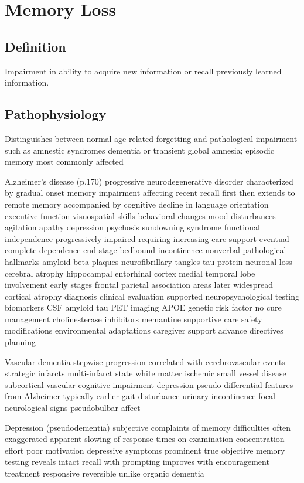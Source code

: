 \chapter{Memory Loss}

\section*{Definition}
Impairment in ability to acquire new information or recall previously learned information.

\section*{Pathophysiology}
Distinguishes between normal age-related forgetting and pathological impairment such as amnestic syndromes dementia or transient global amnesia; episodic memory most commonly affected

Alzheimer's disease (p.170) progressive neurodegenerative disorder characterized by gradual onset memory impairment affecting recent recall first then extends to remote memory accompanied by cognitive decline in language orientation executive function visuospatial skills behavioral changes mood disturbances agitation apathy depression psychosis sundowning syndrome functional independence progressively impaired requiring increasing care support eventual complete dependence end-stage bedbound incontinence nonverbal pathological hallmarks amyloid beta plaques neurofibrillary tangles tau protein neuronal loss cerebral atrophy hippocampal entorhinal cortex medial temporal lobe involvement early stages frontal parietal association areas later widespread cortical atrophy diagnosis clinical evaluation supported neuropsychological testing biomarkers CSF amyloid tau PET imaging APOE genetic risk factor no cure management cholinesterase inhibitors memantine supportive care safety modifications environmental adaptations caregiver support advance directives planning

Vascular dementia stepwise progression correlated with cerebrovascular events strategic infarcts multi-infarct state white matter ischemic small vessel disease subcortical vascular cognitive impairment depression pseudo-differential features from Alzheimer typically earlier gait disturbance urinary incontinence focal neurological signs pseudobulbar affect

Depression (pseudodementia) subjective complaints of memory difficulties often exaggerated apparent slowing of response times on examination concentration effort poor motivation depressive symptoms prominent true objective memory testing reveals intact recall with prompting improves with encouragement treatment responsive reversible unlike organic dementia

